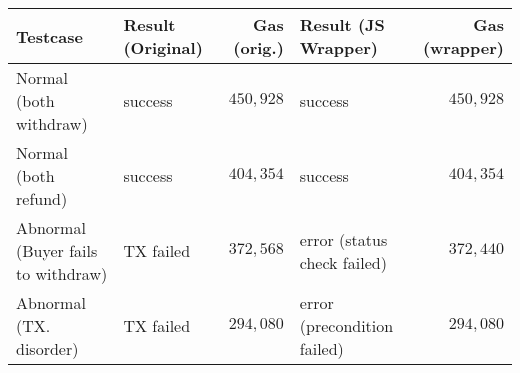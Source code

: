 \documentclass[8pt, english]{jsarticle}
\begin{document}
\begin{tabular}{llrlr}\toprule
Testcase & Result (Original) & Gas (orig.) & Result (JS Wrapper) & Gas (wrapper) \\
\midrule
Normal (both withdraw) & success & $450,928$ & success & $450,928$ \\
Normal (both refund) & success & $404,354$ & success & $404,354$ \\
Abnormal (Buyer fails to withdraw) & TX failed & $372,568$ & error (status check failed) & $372,440$ \\
Abnormal (TX. disorder) & TX failed & $294,080$ & error (precondition failed) & $294,080$ \\
\bottomrule
\end{tabular}
\end{document}
